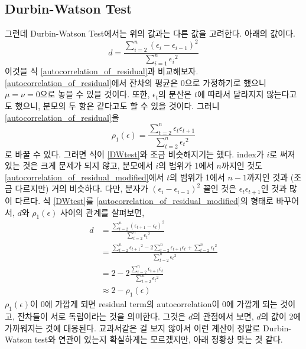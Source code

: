 \documentclass{article}
\begin{document}
\subsection{Durbin-Watson Test}
그런데 Durbin-Watson Test에서는 위의 값과는 다른 값을 고려한다.
아래의 값이다.
\begin{equation}\label{DWtest}
d = \frac{\sum_{i=2}^n(\epsilon_i-\epsilon_{i-1})^2}{\sum_{i=1}^n{\epsilon_i}^2}
\end{equation}
이것을 식 \eqref{autocorrelation_of_residual}과 비교해보자.
\eqref{autocorrelation_of_residual}에서 잔차의 평균은 0으로 가정하기로 했으니 \(\mu=\nu=0\)으로 놓을 수 있을 것이다.
또한, \(\epsilon_t\)의 분산은 \(t\)에 따라서 달라지지 않는다고도 했으니, 분모의 두 항은 같다고도 할 수 있을 것이다.
그러니 \eqref{autocorrelation_of_residual}을
\begin{equation}\label{autocorrelation_of_residual_modified}
\rho_1(\epsilon)=\frac{\sum_{t=2}^n\epsilon_t\epsilon_{t+1}}{\sum_{t=2}^n{\epsilon_t}^2}
\end{equation}
로 바꿀 수 있다.
그러면 식이 \eqref{DWtest}와 조금 비슷해지기는 했다.
index가 $i$로 써져있는 것은 크게 문제가 되지 않고, 분모에서 $i$의 범위가 1에서 \(n\)까지인 것도 \eqref{autocorrelation_of_residual_modified}에서 $t$의 범위가 1에서 \(n-1\)까지인 것과 (조금 다르지만) 거의 비슷하다.
다만, 분자가 \((\epsilon_i-\epsilon_{i-1})^2\) 꼴인 것은 \(\epsilon_t\epsilon_{t+1}\)인 것과 많이 다르다.
식 \eqref{DWtest}를 \eqref{autocorrelation_of_residual_modified}의 형태로 바꾸어서, \(d\)와 \(\rho_1(\epsilon)\) 사이의 관계를 살펴보면,
\begin{equation}\label{relation_between_d_and_rho}
\begin{aligned}
d
&=\frac{\sum_{t=2}^n(\epsilon_{t+1}-\epsilon_t)^2}{\sum_{t=2}^n{\epsilon_t}^2}\\
&=\frac{\sum_{t=2}^n{\epsilon_{t+1}}^2-2\sum_{t=2}^n\epsilon_{t+1}\epsilon_t+\sum_{t=2}^n{\epsilon_t}^2}{\sum_{t=2}^n{\epsilon_t}^2}\\
&=2-2\frac{\sum_{t=2}^n\epsilon_{t+1}\epsilon_t}{\sum_{t=2}^n{\epsilon_t}^2}\\
&\approx 2-\rho_1(\epsilon)
\end{aligned}
\end{equation}
\(\rho_1(\epsilon)\)이 0에 가깝게 되면 residual term의 autocorrelation이 0에 가깝게 되는 것이고, 잔차들이 서로 독립이라는 것을 의미한다.
그것은 \(d\)의 관점에서 보면, \(d\)의 값이 2에 가까워지는 것에 대응된다.
교과서같은 걸 보지 않아서 이런 계산이 정말로 Durbin-Watson test와 연관이 있는지 확실하게는 모르겠지만, 아래 정황상 맞는 것 같다.
\end{document}
